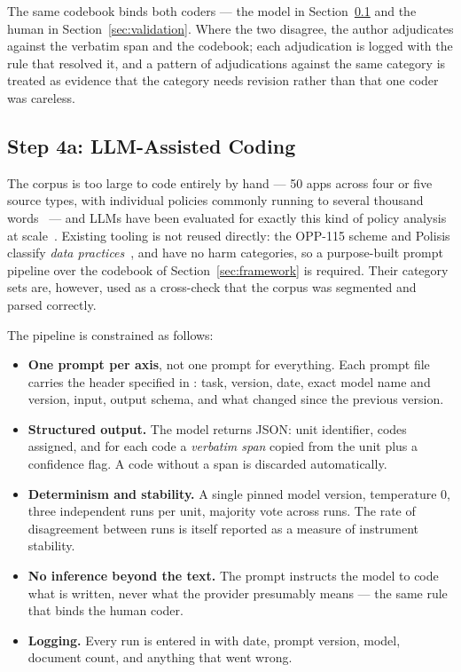 The same codebook binds both coders --- the model in
Section~\ref{sec:llmcoding} and the human in Section~\ref{sec:validation}. Where
the two disagree, the author adjudicates against the verbatim span and the
codebook; each adjudication is logged with the rule that resolved it, and a
pattern of adjudications against the same category is treated as evidence that
the category needs revision rather than that one coder was careless.

\subsection{Step 4a: LLM-Assisted Coding}
\label{sec:llmcoding}

The corpus is too large to code entirely by hand --- 50 apps across four or five
source types, with individual policies commonly running to several thousand
words~\parencite{mcdonald2008cost} --- and LLMs have been evaluated for exactly
this kind of policy analysis at scale~\parencite{rodriguez2024llm}. Existing tooling is not reused directly:
the OPP-115 scheme and Polisis classify \emph{data
practices}~\parencite{wilson2016creation,harkous2018polisis}, and have no harm
categories, so a purpose-built prompt pipeline over the codebook of
Section~\ref{sec:framework} is required. Their category sets are, however, used
as a cross-check that the corpus was segmented and parsed correctly.

The pipeline is constrained as follows:

\begin{itemize}[leftmargin=*,itemsep=2pt]
  \item \textbf{One prompt per axis}, not one prompt for everything. Each prompt
        file carries the header specified in
        : task, version, date, exact model
        name and version, input, output schema, and what changed since the
        previous version.
  \item \textbf{Structured output.} The model returns JSON: unit identifier,
        codes assigned, and for each code a \emph{verbatim span} copied from the
        unit plus a confidence flag. A code without a span is discarded
        automatically.
  \item \textbf{Determinism and stability.} A single pinned model version,
        temperature 0, three independent runs per unit, majority vote across
        runs. The rate of disagreement between runs is itself reported as a
        measure of instrument stability.
  \item \textbf{No inference beyond the text.} The prompt instructs the model to
        code what is written, never what the provider presumably means --- the
        same rule that binds the human coder.
  \item \textbf{Logging.} Every run is entered in
         with date, prompt version, model,
        document count, and anything that went wrong.
\end{itemize}

